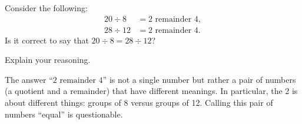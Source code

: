 \documentclass[nooutcomes]{ximera}
\begin{document}
%

\begin{problem}
Consider the following:
\begin{align*}
20 \div 8 &= 2 \text{ remainder }4, \\
28 \div 12 &= 2 \text{ remainder }4.
\end{align*}
Is it correct to say that $20 \div 8 = 28 \div 12$? 

Explain your reasoning.
\begin{freeResponse}
\begin{hint}
The answer ``$2 \text{ remainder }4$'' is not a single number but rather a pair of numbers (a quotient and a remainder) that have different meanings.  In particular, the 2 is about different things: groups of 8 versus groups of 12.  Calling this pair of numbers ``equal'' is questionable.  
\end{hint}
\end{freeResponse}

\end{problem}
\end{document}
